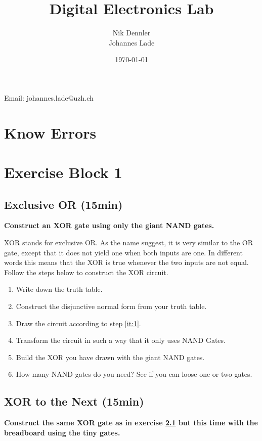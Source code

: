 \documentclass[10pt,a4paper]{article}
\author{Nik Dennler \\ Johannes Lade}
\title{Digital Electronics Lab}
\date{\today{}}
\begin{document}
	
\begin{titlepage}
	\maketitle
		\begin{center}
			Email: johannes.lade@uzh.ch
		\end{center}
	\thispagestyle{empty}
\end{titlepage}

\tableofcontents
\newpage


\section{Know Errors}

\section{Exercise Block 1}

\subsection{Exclusive OR (15min)}\label{subsec:ex-1}
\textbf{Construct an XOR gate using only the giant NAND gates.}

 XOR stands for exclusive OR. As the name suggest, it is very similar to the OR gate, except that it does not yield one when both inputs are one. In different words this means that the XOR is true whenever the two inputs are not equal. Follow the steps below to construct the XOR circuit.
\begin{enumerate}
	\item Write down the truth table.
	\item\label{it:1} Construct the disjunctive normal form from your truth table.
	\item Draw the circuit according to step \ref{it:1}.
	\item Transform the circuit in such a way that it only uses NAND Gates.
	\item Build the XOR you have drawn with the giant NAND gates.
	\item How many NAND gates do you need? See if you can loose one or two gates.
\end{enumerate}

\subsection{XOR to the Next (15min)}
\textbf{Construct the same XOR gate as in exercise \ref{subsec:ex-1} but this time with the breadboard using the tiny gates.}
\end{document}
